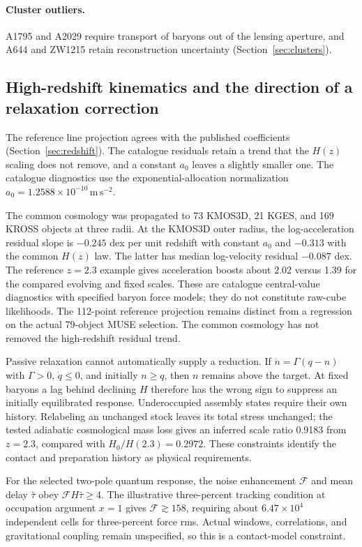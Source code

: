 \paragraph{Cluster outliers.} A1795 and A2029 require transport of
baryons out of the lensing aperture, and A644 and ZW1215 retain
reconstruction uncertainty (Section~\ref{sec:clusters}).

\subsection{High-redshift kinematics and the direction of a relaxation correction}
The reference line projection agrees with the published coefficients
(Section~\ref{sec:redshift}). The catalogue residuals retain a trend that
the $H(z)$ scaling does not remove, and a constant $a_0$ leaves a slightly
smaller one. The catalogue diagnostics use the exponential-allocation
normalization $a_0=1.2588\times10^{-10}\,\mathrm{m\,s^{-2}}$.

The common cosmology was propagated to 73 KMOS3D, 21 KGES, and 169 KROSS
objects at three radii. At the KMOS3D outer radius, the log-acceleration
residual slope is $-0.245$ dex per unit redshift with constant $a_0$ and
$-0.313$ with the common $H(z)$ law. The latter has median log-velocity
residual $-0.087$ dex. The reference $z=2.3$ example gives acceleration
boosts about 2.02 versus 1.39 for the compared evolving and fixed scales.
These are catalogue central-value diagnostics with specified baryon force
models; they do not constitute raw-cube likelihoods. The 112-point
reference projection remains distinct from a regression on the actual
79-object MUSE selection. The common cosmology has not removed the
high-redshift residual trend. 

Passive relaxation cannot automatically supply a reduction. If
$\dot n=\Gamma(q-n)$ with $\Gamma>0$, $\dot q\le0$, and initially
$n\ge q$, then $n$ remains above the target. At fixed baryons a lag behind
declining $H$ therefore has the wrong sign to suppress an initially
equilibrated response. Underoccupied assembly states require their own
history. Relabeling an unchanged stock leaves its total stress unchanged;
the tested adiabatic cosmological mass loss gives an inferred scale ratio
0.9183 from $z=2.3$, compared with $H_0/H(2.3)=0.2972$.
These constraints identify the contact and preparation history as physical
requirements. 

For the selected two-pole quantum response, the noise enhancement
$\mathcal F$ and mean delay $\bar\tau$ obey
$\mathcal F H\bar\tau\ge4$. The illustrative three-percent tracking
condition at occupation argument $x=1$ gives $\mathcal F\gtrsim158$,
requiring about $6.47\times10^4$ independent cells for three-percent
force rms. Actual windows, correlations, and gravitational coupling
remain unspecified, so this is a contact-model constraint.

